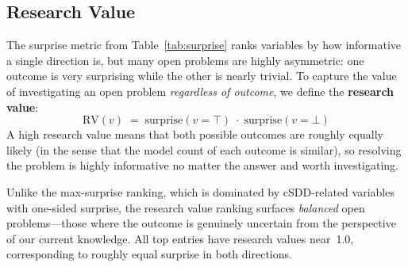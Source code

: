 \documentclass[10pt]{article}
\theoremstyle{plain}
\theoremstyle{definition}
\theoremstyle{remark}
\begin{document}
\subsection{Research Value}

The surprise metric from Table~\ref{tab:surprise} ranks variables by how informative a single direction is, but many open problems are highly asymmetric: one outcome is very surprising while the other is nearly trivial.  To capture the value of investigating an open problem \emph{regardless of outcome}, we define the \textbf{research value}:
\[
  \text{RV}(v) \;=\; \text{surprise}(v = \top) \;\cdot\; \text{surprise}(v = \bot)
\]
A high research value means that both possible outcomes are roughly equally likely (in the sense that the model count of each outcome is similar), so resolving the problem is highly informative no matter the answer and worth investigating.

Unlike the max-surprise ranking, which is dominated by cSDD-related variables with one-sided surprise, the research value ranking surfaces \emph{balanced} open problems---those where the outcome is genuinely uncertain from the perspective of our current knowledge. All top entries have research values near~1.0, corresponding to roughly equal surprise in both directions.
\end{document}
